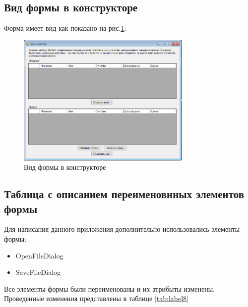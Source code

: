 \subsection{Вид формы в конструкторе}

Форма имеет вид как показано на рис.\ref{fig:FormInConstruct8}:

\begin{figure}[!h]
    \centering
    \includegraphics[width = 0.75\textwidth]{images/Task8/FormInConstructor.png}
    \caption{Вид формы в конструкторе}
    \label{fig:FormInConstruct8}
\end{figure}


\subsection{Таблица с описанием переименовнных элементов формы}

Для написания данного приложения дополнительно использовались элементы формы:

\begin{itemize}
    \item{OpenFileDialog\cite{cite9}}
    \item{SaveFileDialog\cite{cite10}}
\end{itemize}

Все элементы формы были переименованы и их атрибыты изменены. Проведенные изменения представлены в таблице \ref{tab:label8}

